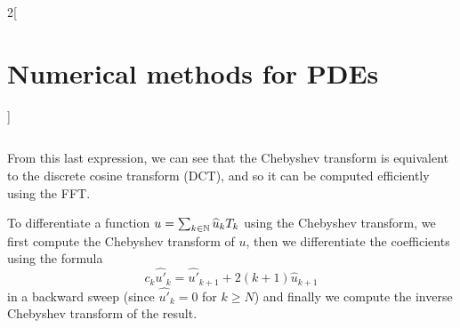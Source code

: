 \documentclass[../../../main_math.tex]{subfiles}
\begin{document}
\begin{multicols}{2}[\section{Numerical methods for PDEs}]
\begin{proposition}
$$    $$
  \end{proposition}
  \begin{remark}
    From this last expression, we can see that the Chebyshev transform is equivalent to the discrete cosine transform (DCT), and so it can be computed efficiently using the FFT.
  \end{remark}
  \begin{remark}
    To differentiate a function $u=\sum_{k\in\mathbb{N}}\widehat{u}_kT_k$ using the Chebyshev transform, we first compute the Chebyshev transform of $u$, then we differentiate the coefficients using the formula
    $$
      c_k\widehat{u'}_k=\widehat{u'}_{k+1}+2(k+1) \widehat{u}_{k+1}
    $$
    in a backward sweep (since $\widehat{u'}_k=0$ for $k\geq N$) and finally we compute the inverse Chebyshev transform of the result.
  \end{remark}
\end{multicols}
\end{document}
